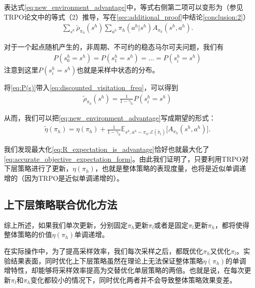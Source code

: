 表达式\eqref{eq:new_environment_advantage}中，等式右侧第二项可以变形为（参见TRPO论文中的等式（2）推导，写在\ref{sec:additional_proof}中结论\ref{conclusion:2}）
\begin{align}
  \sum_{s^h}\tilde{\rho}_{\pi_h}(s^h)\sum_{a^h}\pi_h(a^h|s^h)A_{\pi_h}(s^h,a^h).
  \label{eq:accurate_objective}
\end{align}

对于一个起点随机产生的，非周期、不可约的稳态马尔可夫问题，我们有
\begin{align}
  P(s_0^h = s^h) = P(s_1^h = s^h) = ... = P(s_i^h = s^h)
  \label{eq:P(s)}
\end{align}
注意到这里$P(s_i^h = s^h)$也就是采样中状态的分布。

将\eqref{eq:P(s)}带入\eqref{eq:discounted_visitation_freq}，可以得到
\begin{align}
  \tilde{\rho}_{\pi_h}(s^h) = \frac{1}{1-\gamma_h}P(s_i^h = s^h)
  \label{eq:rho_constant}
\end{align}

从而，我们可以把\eqref{eq:new_environment_advantage}写成期望的形式：
\begin{align}
  \tilde{\eta}(\pi_h) = \eta(\pi_h) + \frac{1}{1-\gamma_h}\mathbb{E}_{s^h, a^h \sim \pi_h, \mathcal{E}(\tilde{\pi_l})}\bigg[A_{\pi_h}(s^h, a^h)\bigg].
  \label{eq:accurate_objective_expectation_form}
\end{align}

我们发现最大化\eqref{eq:R_expectation_is_advantage}恰好也就最大化了\eqref{eq:accurate_objective_expectation_form}。由此我们证明了，只要利用TRPO对下层策略进行了更新，$\eta(\pi_h)$，也就是整体策略的表现度量，也将是近似单调递增的（因为TRPO是近似单调递增的）。

\subsection{上下层策略联合优化方法}
综上所述，如果我们单次更新，分别固定$\pi_h$更新$\pi_l$或者是固定$\pi_l$更新$\pi_h$，都将使得整体策略的价值$\eta(\pi_h)$单调递增。

在实际操作中，为了提高采样效率，我们每次采样之后，都既优化$\pi_h$又优化$\pi_l$。实验结果表面，同时优化上下层策略虽然在理论上无法保证整体策略$\eta(\pi_h)$的单调增特性，却能够将采样效率提高为交替优化单层策略的两倍。也就是说，在每次更新$\pi_l$和$\pi_h$变化都较小的情况下，同时优化两者并不会导致整体策略效果变差。


%
%
%
%
%
%
%
